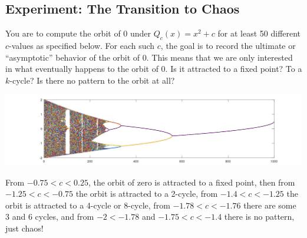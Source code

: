 \documentclass[12pt]{article}
\author{Warren Atkison}
\date{\today}
\begin{document}
\fancyhf{}
\fancyhead[R]{\today}
\fancyfoot[R]{\thepage}

\subsection*{Experiment: The Transition to Chaos}
	You are to compute the orbit of 0 under $Q_c(x) = x^2 + c$ for at
least 50 different $c$-values as specified below. For each such $c$, the goal is to
record the ultimate or “asymptotic” behavior of the orbit of 0. This means
that we are only interested in what eventually happens to the orbit of 0. Is it
attracted to a fixed point? To a $k$-cycle? Is there no pattern to the orbit at
all?

\begin{center}
	\includegraphics[scale = .24]{Fig3.6.jpg}
\end{center}

From $-0.75 < c < 0.25$, the orbit of zero is attracted to a fixed point, then from $-1.25 < c < -0.75$ the orbit is attracted to a 2-cycle, from $-1.4 < c < -1.25$ the orbit is attracted to a 4-cycle or 8-cycle, from $-1.78 < c < -1.76$ there are some 3 and 6 cycles, and from $-2 < -1.78$ and $-1.75 < c < -1.4$ there is no pattern, just chaos!
\end{document}
